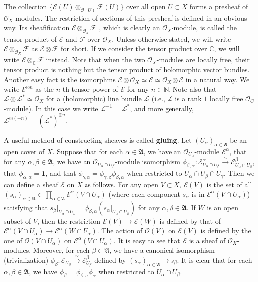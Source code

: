 \documentclass[12pt,b5paper,notitlepage]{report}
\theoremstyle{definition}
\theoremstyle{plain}
\newcommand{\fk}{\mathfrak}
\newcommand{\id}{\mathbf{1}}
\newcommand{\scr}{\mathscr}
\newcommand{\Cbb}{\mathbb C}
\numberwithin{equation}{section}
\begin{document}
The collection $\{\scr E(U)\otimes_{\scr O(U)}\scr F(U)\}$ over all open $U\subset X$ forms a presheaf of $\scr O_X$-modules. The restriction of sections of this presheaf is defined in an obvious way. Its sheafification  $\scr E\otimes_{\scr O_X}\scr F$ \index{EF@$\scr E\otimes_{\scr O_X}\scr F=\scr E\otimes\scr F$}, which is clearly an $\scr O_X$-module, is called the tensor product of $\scr E$ and $\scr F$ over $\scr O_X$. Unless otherwise stated, we will write $\scr E\otimes_{\scr O_X}\scr F$ as  $\scr E\otimes\scr F$ for short. If we consider the tensor product over $\Cbb$, we will write $\scr E\otimes_\Cbb\scr F$ instead. Note that when the two $\scr O_X$-modules are locally free, their tensor product is nothing but the tensor product of holomorphic vector bundles. Another easy fact is the isomorphms $\scr E\otimes\scr O_X\simeq\scr E\simeq\scr O_X\otimes\scr E$ in a natural way. We write $\scr E^{\otimes n}$ as the $n$-th tensor power of $\scr E$ \index{En@$\scr E^{\otimes n}$} for any $n\in\mathbb N$.  Note also that $\scr L\otimes \scr L^*\simeq\scr O_X$ for a (holomorphic) line bundle $\scr L$  (i.e., $\scr L$ is a  rank $1$ locally free $\scr O_C$-module). In this case we write $\scr L^{-1}=\scr L^*$, \index{L-1@$\scr L^{-1}$} and more generally, $\scr L^{\otimes(-n)}=(\scr L^*)^{\otimes n}$.


A useful method of constructing sheaves is called \textbf{gluing}. Let $(U_\alpha)_{\alpha\in\fk A}$ be an open cover of $X$. Suppose that for each $\alpha\in\fk A$, we have an $\scr O_{U_\alpha}$-module $\scr E^\alpha$, that for any $\alpha,\beta\in\fk A$, we have an $\scr O_{U_\alpha\cap U_\beta}$-module isomorphism $\phi_{\beta,\alpha}:\scr E^\alpha_{U_\alpha\cap U_\beta}\xrightarrow{\simeq}\scr E^\beta_{U_\alpha\cap U_\beta}$, that $\phi_{\alpha,\alpha}=\id$, and that $\phi_{\gamma,\alpha}=\phi_{\gamma,\beta}\phi_{\beta,\alpha}$ when restricted to $U_\alpha\cap U_\beta\cap U_\gamma$. Then we can define a sheaf $\scr E$ on $X$ as follows. For any open $V\subset X$, $\scr E(V)$ is the set of all $(s_\alpha)_{\alpha\in\fk A}\in\prod_{\alpha\in\fk A}\scr E^\alpha(V\cap U_\alpha)$ (where each component $s_\alpha$ is in $\scr E^\alpha(V\cap U_\alpha)$) satisfying that $s_\beta|_{U_\alpha\cap U_\beta}=\phi_{\beta,\alpha}(s_\alpha|_{U_\alpha\cap U_\beta})$ for any $\alpha,\beta\in\fk A$. If $W$ is an open subset of $V$, then the restriction $\scr E(V)\rightarrow\scr E(W)$ is defined by that of $\scr E^\alpha(V\cap U_\alpha)\rightarrow \scr E^\alpha(W\cap U_\alpha)$. The action of $\scr O(V)$ on $\scr E(V)$ is defined by the one of $\scr O(V\cap U_\alpha)$ on $\scr E^\alpha(V\cap U_\alpha)$. It is easy to see that $\scr E$ is a sheaf of $\scr O_X$-modules. Moreover, for each $\beta\in\fk A$, we have a canonical isomorphism (trivialization) $\phi_\beta:\scr E_{U_\beta}\xrightarrow{\simeq} \scr E^\beta_{U_\beta}$ defined by $(s_\alpha)_{\alpha\in\fk A}\mapsto s_\beta$. It is clear that for each $\alpha,\beta\in\fk A$, we have $\phi_\beta=\phi_{\beta,\alpha}\phi_\alpha$ when restricted to $U_\alpha\cap U_\beta$.
\end{document}
